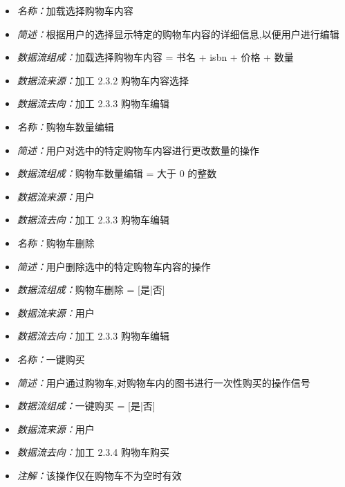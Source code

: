 \vspace{-1mm}

\begin{itemize}
	\item \textit{名称：}加载选择购物车内容
	\item \textit{简述：}根据用户的选择显示特定的购物车内容的详细信息,以便用户进行编辑
	\item \textit{数据流组成：}加载选择购物车内容 = 书名 + isbn + 价格 + 数量
	\item \textit{数据流来源：}加工 2.3.2 购物车内容选择
	\item \textit{数据流去向：}加工 2.3.3 购物车编辑
\end{itemize}

\vspace{-1mm}

\begin{itemize}
	\item \textit{名称：}购物车数量编辑
	\item \textit{简述：}用户对选中的特定购物车内容进行更改数量的操作
	\item \textit{数据流组成：}购物车数量编辑 = 大于 0 的整数
	\item \textit{数据流来源：}用户
	\item \textit{数据流去向：}加工 2.3.3 购物车编辑
\end{itemize}

\vspace{-1mm}

\begin{itemize}
	\item \textit{名称：}购物车删除
	\item \textit{简述：}用户删除选中的特定购物车内容的操作
	\item \textit{数据流组成：}购物车删除 = [是|否]
	\item \textit{数据流来源：}用户
	\item \textit{数据流去向：}加工 2.3.3 购物车编辑
\end{itemize}

\vspace{-1mm}

\begin{itemize}
	\item \textit{名称：}一键购买
	\item \textit{简述：}用户通过购物车,对购物车内的图书进行一次性购买的操作信号
	\item \textit{数据流组成：}一键购买 = [是|否]
	\item \textit{数据流来源：}用户
	\item \textit{数据流去向：}加工 2.3.4 购物车购买
	\item \textit{注解：}该操作仅在购物车不为空时有效
\end{itemize}


